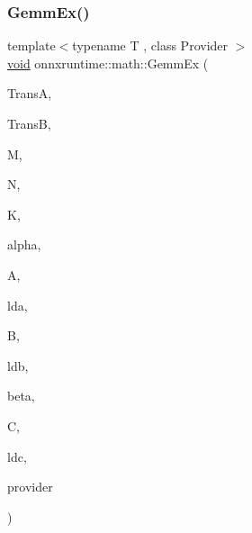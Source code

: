 \subsubsection{\texorpdfstring{Gemm\+Ex()}{GemmEx()}}
{\footnotesize\ttfamily template$<$typename T , class Provider $>$ \\
\mbox{\hyperlink{mlasi_8h_a88f941d423cb2a819b70a1358982b1a6}{void}} onnxruntime\+::math\+::\+Gemm\+Ex (\begin{DoxyParamCaption}\item[{const \mbox{\hyperlink{cblas_8h_a44dfaddb823648755b110dbad849c5a9}{C\+B\+L\+A\+S\+\_\+\+T\+R\+A\+N\+S\+P\+O\+SE}}}]{TransA,  }\item[{const \mbox{\hyperlink{cblas_8h_a44dfaddb823648755b110dbad849c5a9}{C\+B\+L\+A\+S\+\_\+\+T\+R\+A\+N\+S\+P\+O\+SE}}}]{TransB,  }\item[{const int}]{M,  }\item[{const int}]{N,  }\item[{const int}]{K,  }\item[{const T}]{alpha,  }\item[{const T $\ast$}]{A,  }\item[{const int}]{lda,  }\item[{const T $\ast$}]{B,  }\item[{const int}]{ldb,  }\item[{const T}]{beta,  }\item[{T $\ast$}]{C,  }\item[{const int}]{ldc,  }\item[{Provider $\ast$}]{provider }\end{DoxyParamCaption})}

\mbox{\label{namespaceonnxruntime_1_1math_ae7ad1df8b62f3b7c4944a12d7c9a5e53}} 
